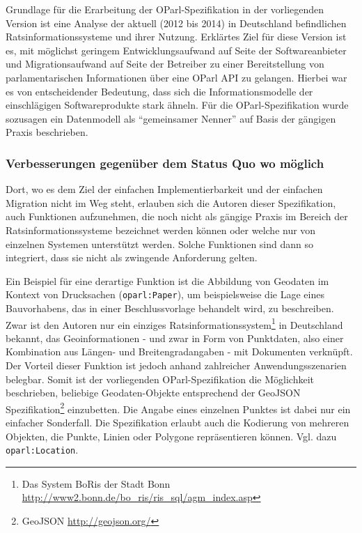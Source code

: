 \documentclass[,a4paper]{article}
\begin{document}
Grundlage für die Erarbeitung der OParl-Spezifikation in der
vorliegenden Version ist eine Analyse der aktuell (2012 bis 2014) in
Deutschland befindlichen Ratsinformationssysteme und ihrer Nutzung.
Erklärtes Ziel für diese Version ist es, mit möglichst geringem
Entwicklungsaufwand auf Seite der Softwareanbieter und Migrationsaufwand
auf Seite der Betreiber zu einer Bereitstellung von parlamentarischen
Informationen über eine OParl API zu gelangen. Hierbei war es von
entscheidender Bedeutung, dass sich die Informationsmodelle der
einschlägigen Softwareprodukte stark ähneln. Für die OParl-Spezifikation
wurde sozusagen ein Datenmodell als ``gemeinsamer Nenner'' auf Basis der
gängigen Praxis beschrieben.

\subsubsection{Verbesserungen gegenüber dem Status Quo wo
möglich}\label{verbesserungen-gegenuxfcber-dem-status-quo-wo-muxf6glich}

Dort, wo es dem Ziel der einfachen Implementierbarkeit und der einfachen
Migration nicht im Weg steht, erlauben sich die Autoren dieser
Spezifikation, auch Funktionen aufzunehmen, die noch nicht als gängige
Praxis im Bereich der Ratsinformationssysteme bezeichnet werden können
oder welche nur von einzelnen Systemen unterstützt werden. Solche
Funktionen sind dann so integriert, dass sie nicht als zwingende
Anforderung gelten.

Ein Beispiel für eine derartige Funktion ist die Abbildung von Geodaten
im Kontext von Drucksachen (\texttt{oparl:Paper}), um beispielsweise die
Lage eines Bauvorhabens, das in einer Beschlussvorlage behandelt wird,
zu beschreiben. Zwar ist den Autoren nur ein einziges
Ratsinformationssystem\footnote{Das System BoRis der Stadt Bonn
  \url{http://www2.bonn.de/bo_ris/ris_sql/agm_index.asp}} in Deutschland
bekannt, das Geoinformationen - und zwar in Form von Punktdaten, also
einer Kombination aus Längen- und Breitengradangaben - mit Dokumenten
verknüpft. Der Vorteil dieser Funktion ist jedoch anhand zahlreicher
Anwendungsszenarien belegbar. Somit ist der vorliegenden
OParl-Spezifikation die Möglichkeit beschrieben, beliebige
Geodaten-Objekte entsprechend der GeoJSON Spezifikation\footnote{GeoJSON
  \url{http://geojson.org/}} einzubetten. Die Angabe eines einzelnen
Punktes ist dabei nur ein einfacher Sonderfall. Die Spezifikation
erlaubt auch die Kodierung von mehreren Objekten, die Punkte, Linien
oder Polygone repräsentieren können. Vgl. dazu \texttt{oparl:Location}.
\end{document}
